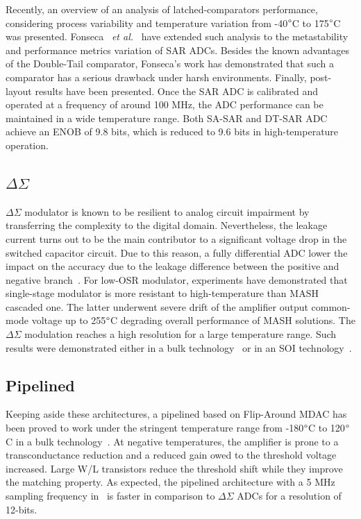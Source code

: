 Recently, an overview of an analysis of latched-comparators performance, considering process variability and temperature variation from -40\(\degree \)C to 175\(\degree \)C was presented. Fonseca ~\textit{et al.}~\cite{Fonseca2018} have extended such analysis to the metastability and performance metrics variation of SAR ADCs. Besides the known advantages of the Double-Tail comparator, Fonseca's work has demonstrated that such a comparator has a serious drawback under harsh environments. Finally, post-layout results have been presented. Once the SAR ADC is calibrated and operated at a frequency of around 100 MHz, the ADC performance can be maintained in a wide temperature range. Both SA-SAR and DT-SAR ADC achieve an ENOB of 9.8 bits, which is reduced to 9.6 bits in high-temperature operation.

\subsection{$\Delta\Sigma$}
\(\Delta\Sigma \) modulator is known to be resilient to analog circuit impairment by transferring the complexity to the digital domain. Nevertheless, the leakage current turns out to be the main contributor to a significant voltage drop in the switched capacitor circuit. Due to this reason, a fully differential ADC lower the impact on the accuracy due to the leakage difference between the positive and negative branch~\cite{Davis2003}. For low-OSR modulator, experiments have demonstrated that single-stage modulator is more resistant to high-temperature than MASH cascaded one. The latter underwent severe drift of the amplifier output common-mode voltage up to 255\(\degree \)C degrading overall performance of MASH solutions. The $\Delta\Sigma$ modulation reaches a high resolution for a large temperature range. Such results were demonstrated either in a bulk technology~\cite{Davis2003} or in an SOI technology~\cite{Ericson2004}.

\subsection{Pipelined}
Keeping aside these architectures, a pipelined based on Flip-Around MDAC has been proved to work under the stringent temperature range from -180\(\degree \)C to 120\(\degree \)C in a bulk technology~\cite{Yao2010}. At negative temperatures, the amplifier is prone to a transconductance reduction and a reduced gain owed to the threshold voltage increased. Large W/L transistors reduce the threshold shift while they improve the matching property. As expected, the pipelined architecture with a 5 MHz sampling frequency in~\cite{Yao2010} is faster in comparison to $\Delta\Sigma$ ADCs for a resolution of 12-bits.

